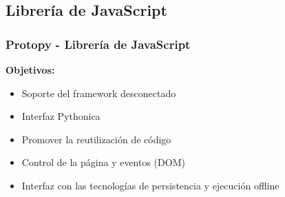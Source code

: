 \documentclass{beamer}
\begin{document}
\subsection{Librería de JavaScript}
\begin{frame}
    \frametitle{Protopy - Librería de JavaScript}
    
            {\bf Objetivos:}\par
                \begin{itemize}
                        \item{Soporte del framework desconectado}
                        \item{Interfaz Pythonica}
                        \item{Promover la reutilización de código}
                        \item{Control de la página y eventos (DOM)}
                        \item{Interfaz con las tecnologías de persistencia y ejecución offline} 
                \end{itemize}     
         
\end{frame}    
      
\end{document}
